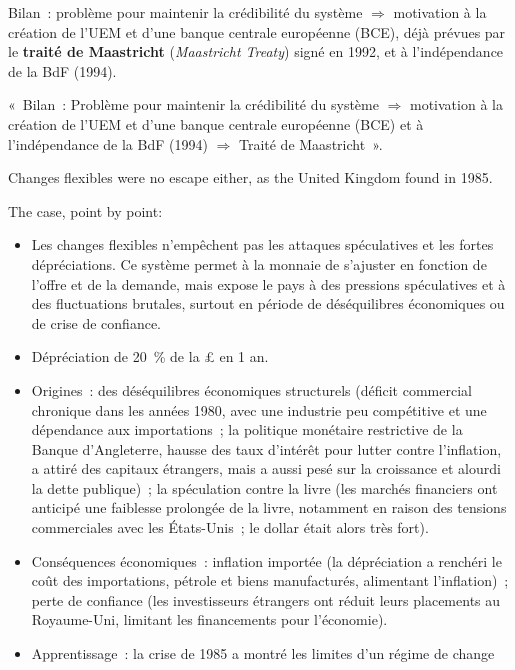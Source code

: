 Bilan~: problème pour maintenir la crédibilité du système $\Rightarrow$ motivation à la
création de l'UEM et d'une banque centrale européenne (BCE), déjà prévues par le
\textbf{traité de Maastricht} (\textit{Maastricht Treaty}) signé en 1992, et à
l'indépendance de la BdF (1994).

\begin{remark}
  «~Bilan~: Problème pour maintenir la crédibilité du système $\Rightarrow$
  motivation à la création de l'UEM et d'une banque centrale européenne (BCE) et à
  l'indépendance de la BdF (1994) $\Rightarrow$ Traité de Maastricht~».
\end{remark}

Changes flexibles were no escape either, as the United Kingdom found in 1985.

\begin{example}
  The case, point by point:
  \begin{itemize}
    \item Les changes flexibles n'empêchent pas les attaques spéculatives et les fortes
      dépréciations. Ce système permet à la monnaie de s'ajuster en fonction de l'offre
      et de la demande, mais expose le pays à des pressions spéculatives et à des
      fluctuations brutales, surtout en période de déséquilibres économiques ou de crise
      de confiance.
    \item Dépréciation de 20~\% de la £ en 1 an.
    \item Origines~: des déséquilibres économiques structurels (déficit commercial
      chronique dans les années 1980, avec une industrie peu compétitive et une
      dépendance aux importations~; la politique monétaire restrictive de la Banque
      d'Angleterre, hausse des taux d'intérêt pour lutter contre l'inflation, a attiré
      des capitaux étrangers, mais a aussi pesé sur la croissance et alourdi la dette
      publique)~; la spéculation contre la livre (les marchés financiers ont anticipé
      une faiblesse prolongée de la livre, notamment en raison des tensions commerciales
      avec les États-Unis~; le dollar était alors très fort).
    \item Conséquences économiques~: inflation importée (la dépréciation a renchéri le
      coût des importations, pétrole et biens manufacturés, alimentant l'inflation)~;
      perte de confiance (les investisseurs étrangers ont réduit leurs placements au
      Royaume-Uni, limitant les financements pour l'économie).
    \item Apprentissage~: la crise de 1985 a montré les limites d'un régime de change

\end{itemize}
\end{example}
